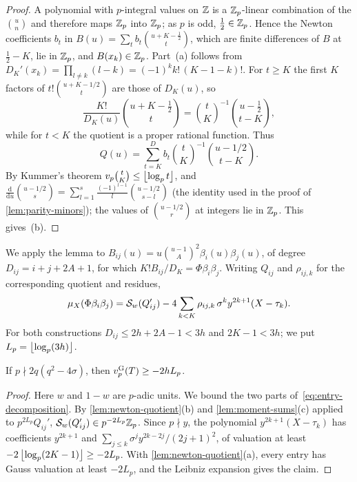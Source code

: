 \begin{proof}
A polynomial with $p$-integral values on $\mathbb{Z}$ is a $\mathbb{Z}_p$-linear combination of the $\binom un$
and therefore maps $\mathbb{Z}_p$ into $\mathbb{Z}_p$; as $p$ is odd, $\frac12\in\mathbb{Z}_p$. Hence the Newton
coefficients $b_t$ in $B(u)=\sum_tb_t\binom{u+K-\frac12}{t}$, which are finite differences of
$B$ at $\frac12-K$, lie in $\mathbb{Z}_p$, and $B(x_k)\in\mathbb{Z}_p$. Part~(a) follows from
$D_K'(x_k)=\prod_{l\ne k}(l-k)=(-1)^kk!\,(K-1-k)!$. For $t\ge K$ the first $K$ factors of
$t!\binom{u+K-1/2}{t}$ are those of $D_K(u)$, so
\[
  \frac{K!}{D_K(u)}\binom{u+K-\frac12}{t}=\binom{t}{K}^{-1}\binom{u-\frac12}{t-K},
\]
while for $t<K$ the quotient is a proper rational function. Thus
\[
  Q(u)=\sum_{t=K}^{D}b_t\binom tK^{-1}\binom{u-1/2}{t-K}.
\]
By Kummer's theorem
$v_p\binom tK\le\left\lfloor \log_pt\right\rfloor$, and
$\frac{\mathrm d}{\mathrm du}\binom{u-1/2}{s}=\sum_{l=1}^{s}\frac{(-1)^{l-1}}{l}\binom{u-1/2}{s-l}$
(the identity used in the proof of \cref{lem:parity-minors}); the values of $\binom{u-1/2}{r}$
at integers lie in $\mathbb{Z}_p$. This gives~(b).
\end{proof}

We apply the lemma to $B_{ij}(u)=u\binom{u-1}{A}^2\beta_i(u)\beta_j(u)$, of degree
$D_{ij}=i+j+2A+1$, for which $K!B_{ij}/D_K=\Phi\beta_i\beta_j$. Writing $Q_{ij}$ and
$\rho_{ij,k}$ for the corresponding quotient and residues,
\begin{equation}\label{eq:entry-decomposition}
  \mu_X(\Phi\beta_i\beta_j)=\mathcal{S}_w(Q_{ij}')-4\sum_{k<K}\rho_{ij,k}\,\sigma^ky^{2k+1}(X-\tau_k).
\end{equation}
For both constructions $D_{ij}\le2h+2A-1<3h$ and $2K-1<3h$; we put $L_p=\left\lfloor \log_p(3h)\right\rfloor$.

\begin{proposition}\label{prop:uniform}
If $p\nmid 2q(q^2-4\sigma)$, then $v_{p}^{\mathrm{G}}(T)\ge-2hL_p$.
\end{proposition}

\begin{proof}
Here $w$ and $1-w$ are $p$-adic units. We bound the two parts of~\eqref{eq:entry-decomposition}.
By \cref{lem:newton-quotient}(b) and
\cref{lem:moment-sums}(c) applied to $p^{2L_p}Q_{ij}'$, $\mathcal{S}_w(Q_{ij}')\in p^{-2L_p}\mathbb{Z}_p$. Since
$p\nmid y$, the polynomial $y^{2k+1}(X-\tau_k)$ has coefficients $y^{2k+1}$ and
$\sum_{j\le k}\sigma^jy^{2k-2j}/(2j+1)^2$, of valuation at least $-2\left\lfloor \log_p(2K-1)\right\rfloor\ge-2L_p$.
With \cref{lem:newton-quotient}(a), every entry has Gauss valuation at least $-2L_p$, and the
Leibniz expansion gives the claim.
\end{proof}


